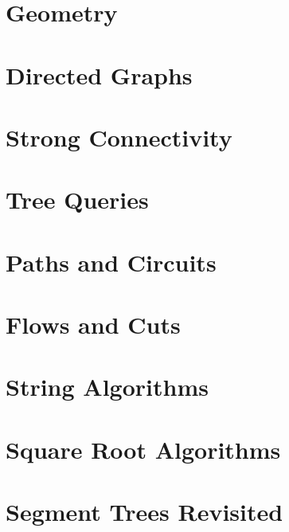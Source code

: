 \documentclass[12pt,letterpaper]{book}
\theoremstyle{definition}
\theoremstyle{remark}
\begin{document}

\chapter{Geometry}


\chapter{Directed Graphs}


\chapter{Strong Connectivity}


\chapter{Tree Queries}


\chapter{Paths and Circuits}


\chapter{Flows and Cuts}


\chapter{String Algorithms}


\chapter{Square Root Algorithms}


\chapter{Segment Trees Revisited}
\end{document}
